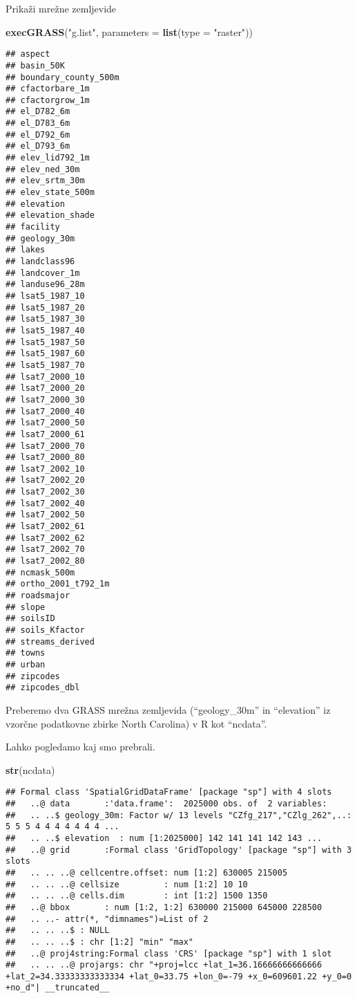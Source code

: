\documentclass[]{article}
\newenvironment{Shaded}{\begin{snugshade}}{\end{snugshade}}
\newcommand{\KeywordTok}[1]{\textcolor[rgb]{0.13,0.29,0.53}{\textbf{#1}}}
\newcommand{\DataTypeTok}[1]{\textcolor[rgb]{0.13,0.29,0.53}{#1}}
\newcommand{\StringTok}[1]{\textcolor[rgb]{0.31,0.60,0.02}{#1}}
\newcommand{\NormalTok}[1]{#1}
\begin{document}
Prikaži mrežne zemljevide

\begin{Shaded}
\begin{Highlighting}[]
\KeywordTok{execGRASS}\NormalTok{(}\StringTok{"g.list"}\NormalTok{, }\DataTypeTok{parameters =} \KeywordTok{list}\NormalTok{(}\DataTypeTok{type =} \StringTok{"raster"}\NormalTok{))}
\end{Highlighting}
\end{Shaded}

\begin{verbatim}
## aspect
## basin_50K
## boundary_county_500m
## cfactorbare_1m
## cfactorgrow_1m
## el_D782_6m
## el_D783_6m
## el_D792_6m
## el_D793_6m
## elev_lid792_1m
## elev_ned_30m
## elev_srtm_30m
## elev_state_500m
## elevation
## elevation_shade
## facility
## geology_30m
## lakes
## landclass96
## landcover_1m
## landuse96_28m
## lsat5_1987_10
## lsat5_1987_20
## lsat5_1987_30
## lsat5_1987_40
## lsat5_1987_50
## lsat5_1987_60
## lsat5_1987_70
## lsat7_2000_10
## lsat7_2000_20
## lsat7_2000_30
## lsat7_2000_40
## lsat7_2000_50
## lsat7_2000_61
## lsat7_2000_70
## lsat7_2000_80
## lsat7_2002_10
## lsat7_2002_20
## lsat7_2002_30
## lsat7_2002_40
## lsat7_2002_50
## lsat7_2002_61
## lsat7_2002_62
## lsat7_2002_70
## lsat7_2002_80
## ncmask_500m
## ortho_2001_t792_1m
## roadsmajor
## slope
## soilsID
## soils_Kfactor
## streams_derived
## towns
## urban
## zipcodes
## zipcodes_dbl
\end{verbatim}

Preberemo dva GRASS mrežna zemljevida (``geology\_30m'' in ``elevation''
iz vzorčne podatkovne zbirke North Carolina) v R kot ``ncdata''.

Lahko pogledamo kaj smo prebrali.

\begin{Shaded}
\begin{Highlighting}[]
\KeywordTok{str}\NormalTok{(ncdata)}
\end{Highlighting}
\end{Shaded}

\begin{verbatim}
## Formal class 'SpatialGridDataFrame' [package "sp"] with 4 slots
##   ..@ data       :'data.frame':  2025000 obs. of  2 variables:
##   .. ..$ geology_30m: Factor w/ 13 levels "CZfg_217","CZlg_262",..: 5 5 5 4 4 4 4 4 4 4 ...
##   .. ..$ elevation  : num [1:2025000] 142 141 141 142 143 ...
##   ..@ grid       :Formal class 'GridTopology' [package "sp"] with 3 slots
##   .. .. ..@ cellcentre.offset: num [1:2] 630005 215005
##   .. .. ..@ cellsize         : num [1:2] 10 10
##   .. .. ..@ cells.dim        : int [1:2] 1500 1350
##   ..@ bbox       : num [1:2, 1:2] 630000 215000 645000 228500
##   .. ..- attr(*, "dimnames")=List of 2
##   .. .. ..$ : NULL
##   .. .. ..$ : chr [1:2] "min" "max"
##   ..@ proj4string:Formal class 'CRS' [package "sp"] with 1 slot
##   .. .. ..@ projargs: chr "+proj=lcc +lat_1=36.16666666666666 +lat_2=34.33333333333334 +lat_0=33.75 +lon_0=-79 +x_0=609601.22 +y_0=0 +no_d"| __truncated__
\end{verbatim}
\end{document}
